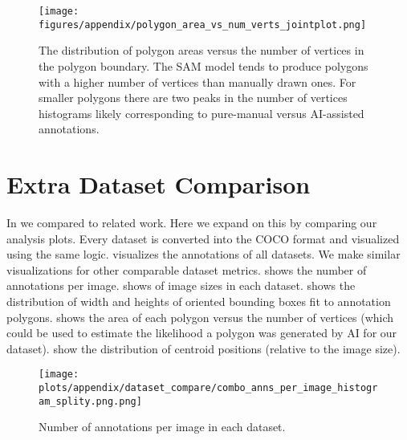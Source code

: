 \begin{figure}[ht]
\centering
\texttt{[image: figures/appendix/polygon\_area\_vs\_num\_verts\_jointplot.png]}
\caption[]{
    The distribution of polygon areas versus the number of vertices in the polygon boundary.
    The SAM model tends to produce polygons with a higher number of vertices
    than manually drawn ones.  For smaller polygons there are two peaks in the
    number of vertices histograms likely corresponding to pure-manual versus
    AI-assisted annotations.
}
\label{fig:annot_area_verts_distri}
\end{figure}


\section{Extra Dataset Comparison}

In  we compared to related work. Here we expand on this
by comparing our analysis plots. Every dataset is converted into the COCO
format and visualized using the same logic. 
visualizes the annotations of all datasets. We make similar visualizations 
for other comparable dataset metrics.
 shows the number of annotations per image.
 shows of image sizes in each dataset.
 shows the distribution of width and heights of oriented bounding boxes fit to annotation polygons.
 shows the area of each polygon versus the number of vertices (which could be used to estimate the likelihood a polygon was generated by AI for our dataset).
 show the distribution of centroid positions (relative to the image size).




\begin{figure*}[ht]
\centering
\texttt{[image: plots/appendix/dataset\_compare/combo\_anns\_per\_image\_histogram\_splity.png.png]}
\caption[]{
    Number of annotations per image in each dataset.
}
\label{fig:combo_anns_per_image_histogram_splity}
\end{figure*}


